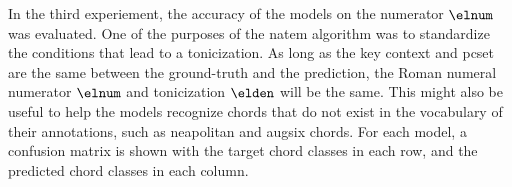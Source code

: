 
In the third experiement, the accuracy of the models on the
numerator $\elnum$ was evaluated. One of the purposes of the
\gls{natem} algorithm was to standardize the conditions that
lead to a tonicization. As long as the key context and
\gls{pcset} are the same between the ground-truth and the
prediction, the Roman numeral numerator $\elnum$ and
tonicization $\elden$ will be the same. This might also be
useful to help the models recognize chords that do not exist
in the vocabulary of their annotations, such as
\gls{neapolitan} and \gls{augsix} chords. For each model, a
confusion matrix is shown with the target chord classes in
each row, and the predicted chord classes in each column.
